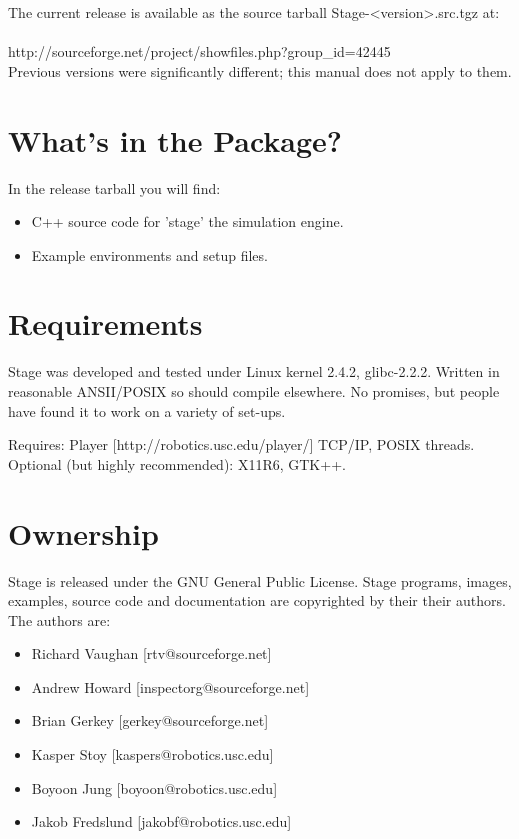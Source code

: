 \documentclass[11pt,twoside]{report}
\begin{document}
   \noindent The current release is available as the source tarball
 Stage-<version>.src.tgz at:\\\\ \indent
 http://sourceforge.net/project/showfiles.php?group\_id=42445\\

	Previous versions were significantly different; this manual
   does not apply to them.

  \section{What's in the Package?}

    In the release tarball you will find:
      \begin{itemize}    
      \item C++ source code for 'stage' the simulation engine.
      \item Example environments and setup files.
      \end{itemize}



  \section{Requirements}

    Stage was developed and tested under Linux kernel 2.4.2,
    glibc-2.2.2.  Written in reasonable ANSII/POSIX so should compile
    elsewhere. No promises, but people have found it to work on a
    variety of set-ups.

    Requires: Player [http://robotics.usc.edu/player/]
              TCP/IP, POSIX threads.
	Optional (but highly recommended): X11R6, GTK++.
  
  \section{Ownership}

    Stage is released under the GNU General Public
    License. Stage programs, images, examples, source code and
    documentation are copyrighted by their their authors. The authors are:

      \begin{itemize}
      \item[] Richard Vaughan [rtv@sourceforge.net]
      \item[] Andrew Howard [inspectorg@sourceforge.net]
      \item[] Brian Gerkey [gerkey@sourceforge.net]
      \item[] Kasper Stoy [kaspers@robotics.usc.edu]
      \item[] Boyoon Jung [boyoon@robotics.usc.edu]
      \item[] Jakob Fredslund [jakobf@robotics.usc.edu]
      \end{itemize}
\end{document}
